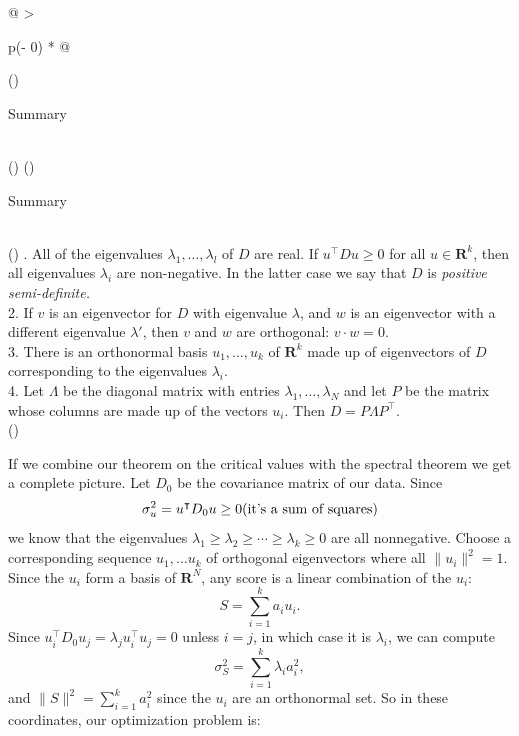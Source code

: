 \documentclass[
  11pt,
  letterpaper,
]{scrbook}
\theoremstyle{plain}
\theoremstyle{plain}
\theoremstyle{remark}
\begin{document}
\hypertarget{tbl-symmmat}{}
\begin{longtable}[]{@{}
  >{\raggedright\arraybackslash}p{(\columnwidth - 0\tabcolsep) * }@{}}
\caption{\label{tbl-symmmat}Properties of Eigenvalues of Real Symmetric
Matrices}\tabularnewline
\toprule()
\begin{minipage}[b]{\linewidth}\raggedright
Summary
\end{minipage} \\
\midrule()
\endfirsthead
\toprule()
\begin{minipage}[b]{\linewidth}\raggedright
Summary
\end{minipage} \\
\midrule()
. All of the eigenvalues \(\lambda_{1},\ldots, \lambda_{l}\) of \(D\)
are real. If \(u^{\intercal}Du\ge 0\) for all \(u\in\mathbf{R}^{k}\),
then all eigenvalues \(\lambda_{i}\) are non-negative. In the latter
case we say that \(D\) is \emph{positive semi-definite.} \\
2. If \(v\) is an eigenvector for \(D\) with eigenvalue \(\lambda\), and
\(w\) is an eigenvector with a different eigenvalue \(\lambda'\), then
\(v\) and \(w\) are orthogonal: \(v\cdot w = 0\). \\
3. There is an orthonormal basis \(u_{1},\ldots, u_{k}\) of
\(\mathbf{R}^{k}\) made up of eigenvectors of \(D\) corresponding to the
eigenvalues \(\lambda_{i}\). \\
4. Let \(\Lambda\) be the diagonal matrix with entries
\(\lambda_{1},\ldots, \lambda_{N}\) and let \(P\) be the matrix whose
columns are made up of the vectors \(u_{i}\). Then
\(D = P\Lambda P^{\intercal}.\) \\
\bottomrule()
\end{longtable}

If we combine our theorem on the critical values with the spectral
theorem we get a complete picture. Let \(D_{0}\) be the covariance
matrix of our data. Since \[
\sigma_{u}^2 = u^{\intercal}D_{0}u\ge 0 \hbox{(it's a sum of squares)}
\] we know that the eigenvalues
\(\lambda_{1}\ge\lambda_{2}\ge \cdots \ge \lambda_{k}\ge 0\) are all
nonnegative. Choose a corresponding sequence \(u_{1},\ldots u_{k}\) of
orthogonal eigenvectors where all \(\|u_{i}\|^2=1\). Since the \(u_{i}\)
form a basis of \(\mathbf{R}^{N}\), any score is a linear combination of
the \(u_{i}\): \[
S = \sum_{i=1}^{k} a_{i}u_{i}.
\] Since
\(u_{i}^{\intercal}D_{0}u_{j} = \lambda_{j}u_{i}^{\intercal}u_{j} = 0\)
unless \(i=j\), in which case it is \(\lambda_{i}\), we can compute \[
\sigma_{S}^2 = \sum_{i=1}^{k} \lambda_{i}a_{i}^2,
\] and \(\|S\|^2=\sum_{i=1}^{k} a_{i}^2\) since the \(u_{i}\) are an
orthonormal set. So in these coordinates, our optimization problem is:
\end{document}
